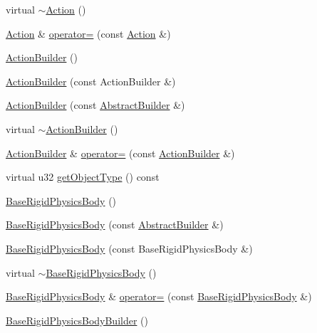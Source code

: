 \begin{DoxyCompactItemize}
\item 
virtual \hyperlink{namespacejli_a366502b547b6ed3de30f23020a65df04}{$\sim$\+Action} ()
\item 
\hyperlink{namespacejli_ac1d6edc4f796157e771fb531302807c5}{Action} \& \hyperlink{namespacejli_a3652a77b1603e782ad8ac9ff69eb0f83}{operator=} (const \hyperlink{namespacejli_ac1d6edc4f796157e771fb531302807c5}{Action} \&)
\item 
\hyperlink{namespacejli_add5250909a3a5a38d28295b426e43da7}{Action\+Builder} ()
\item 
\hyperlink{namespacejli_a96508fbaf421e7088d0213d649abf7ba}{Action\+Builder} (const Action\+Builder \&)
\item 
\hyperlink{namespacejli_ab6f83e83f1cecc616fbcc6dab3d26954}{Action\+Builder} (const \hyperlink{classjli_1_1_abstract_builder}{Abstract\+Builder} \&)
\item 
virtual \hyperlink{namespacejli_ab2e77266449aea2fbf9db5435931dc84}{$\sim$\+Action\+Builder} ()
\item 
\hyperlink{namespacejli_add5250909a3a5a38d28295b426e43da7}{Action\+Builder} \& \hyperlink{namespacejli_a52eac4944ed6adea3292bb7646e89bb1}{operator=} (const \hyperlink{namespacejli_add5250909a3a5a38d28295b426e43da7}{Action\+Builder} \&)
\item 
virtual u32 \hyperlink{namespacejli_ad74268a8f5493ee3df657a346cd64d30}{get\+Object\+Type} () const 
\item 
\hyperlink{namespacejli_a98e0507c420540776aa9f21e81027e0c}{Base\+Rigid\+Physics\+Body} ()
\item 
\hyperlink{namespacejli_a4637557b69faf270ee5531c61586f09c}{Base\+Rigid\+Physics\+Body} (const \hyperlink{classjli_1_1_abstract_builder}{Abstract\+Builder} \&)
\item 
\hyperlink{namespacejli_a704fd69b6e610f90f51f7a734f7a6b0a}{Base\+Rigid\+Physics\+Body} (const Base\+Rigid\+Physics\+Body \&)
\item 
virtual \hyperlink{namespacejli_ae945134a5ad3fd6da757b1f5ee871427}{$\sim$\+Base\+Rigid\+Physics\+Body} ()
\item 
\hyperlink{namespacejli_a98e0507c420540776aa9f21e81027e0c}{Base\+Rigid\+Physics\+Body} \& \hyperlink{namespacejli_a153d8db97f7793fc3526297dbedca3ec}{operator=} (const \hyperlink{namespacejli_a98e0507c420540776aa9f21e81027e0c}{Base\+Rigid\+Physics\+Body} \&)
\item 
\hyperlink{namespacejli_a4cdb474048fb5433420b96f927f9b817}{Base\+Rigid\+Physics\+Body\+Builder} ()
\item 

\end{DoxyCompactItemize}
